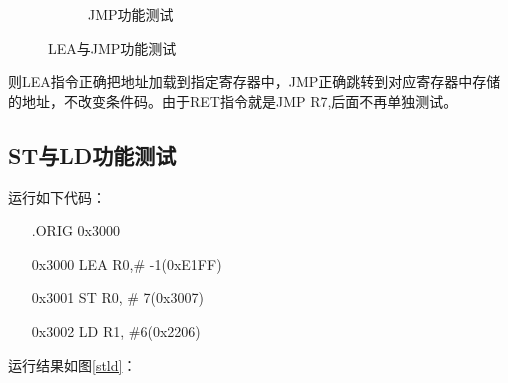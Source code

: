 \documentclass[UTF8]{ctexart}
\begin{document}
\begin{figure}[htbp]
\begin{subfigure}{0.48\textwidth}
    \caption{JMP功能测试}
  \end{subfigure}
  \caption{LEA与JMP功能测试}
  \label{leajmp}
\end{figure}

则LEA指令正确把地址加载到指定寄存器中，JMP正确跳转到对应寄存器中存储的地址，不改变条件码。由于RET指令就是JMP R7,后面不再单独测试。

\subsection{ST与LD功能测试}
运行如下代码：
\begin{enumerate}
  \item [ ] .ORIG 0x3000
  \item [0x3000] LEA R0,\# -1(0xE1FF)
  \item [0x3001] ST R0, \# 7(0x3007)
  \item [0x3002] LD R1, \#6(0x2206)
\end{enumerate}
运行结果如图\ref{stld}：
\end{document}

